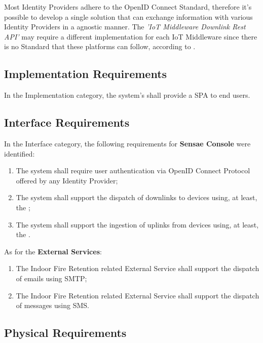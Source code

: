 Most Identity Providers adhere to the OpenID Connect Standard, therefore it's possible to develop a single solution that can exchange information with various Identity Providers in a agnostic manner.
The \textit{'\gls{IoT} Middleware Downlink Rest API'} may require a different implementation for each \gls{IoT} Middleware since there is no Standard that these platforms can follow, according to \cite{KOO20224191}.  

\subsection{Implementation Requirements}
\label{subsec:requirements:non_functional:implementation}

In the Implementation category, the system's shall provide a \gls{SPA} to end users.

\subsection{Interface Requirements}
\label{subsec:requirements:non_functional:interface}

In the Interface category, the following requirements for \textbf{Sensae Console} were identified:

\begin{enumerate}
    \item The system shall require user authentication via OpenID Connect Protocol offered by any Identity Provider;
    \item The system shall support the dispatch of downlinks to devices using, at least, the ;
    \item The system shall support the ingestion of uplinks from devices using, at least, the .
\end{enumerate}

As for the \textbf{External Services}:

\begin{enumerate}
    \item The Indoor Fire Retention related External Service shall support the dispatch of emails using \gls{SMTP};
    \item The Indoor Fire Retention related External Service shall support the dispatch of messages using \gls{SMS}.
\end{enumerate}

\subsection{Physical Requirements}
\label{subsec:requirements:non_functional:physical}

